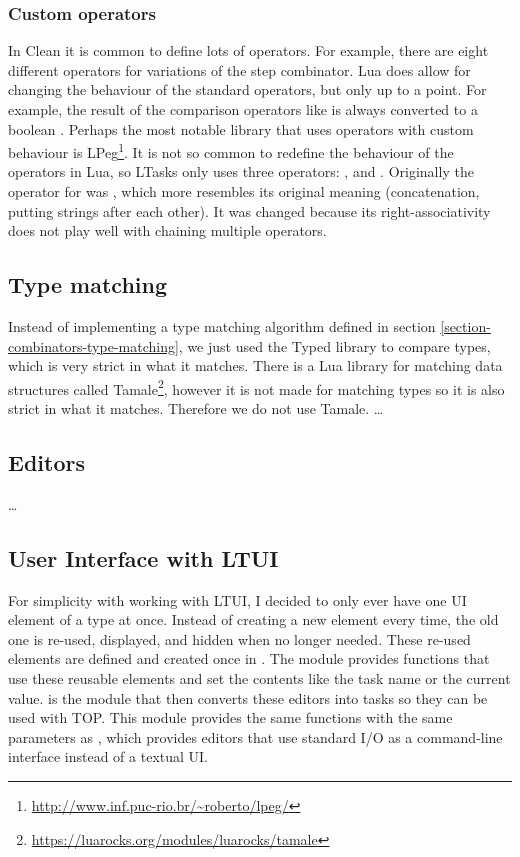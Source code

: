 \subsubsection{Custom operators}
In Clean it is common to define lots of operators. For example, there are eight different operators for variations of the step combinator. Lua does allow for changing the behaviour of the standard operators, but only up to a point. For example, the result of the comparison operators like \lua{<} is always converted to a boolean \cite{luareferencemanual}. Perhaps the most notable library that uses operators with custom behaviour is LPeg\footnote{\url{http://www.inf.puc-rio.br/~roberto/lpeg/}}. It is not so common to redefine the behaviour of the operators in Lua, so LTasks only uses three operators: \lua{~}, \lua{&} and \lua{|}. Originally the operator for  was , which more resembles its original meaning (concatenation, putting strings after each other). It was changed because its right-associativity does not play well with chaining multiple operators.

\subsection{Type matching}
Instead of implementing a type matching algorithm defined in section \ref{section-combinators-type-matching}, we just used the Typed library to compare types, which is very strict in what it matches. There is a Lua library for matching data structures called Tamale\footnote{\url{https://luarocks.org/modules/luarocks/tamale}}, however it is not made for matching types so it is also strict in what it matches. Therefore we do not use Tamale. \dots

\subsection{Editors}
\dots

\subsection{User Interface with LTUI}
For simplicity with working with LTUI, I decided to only ever have one UI element of a type at once. Instead of creating a new element every time, the old one is re-used, displayed, and hidden when no longer needed. These re-used elements are defined and created once in .
The module  provides functions that use these reusable elements and set the contents like the task name or the current value.
 is the module that then converts these editors into tasks so they can be used with TOP. This module provides the same functions with the same parameters as , which provides editors that use standard I/O as a command-line interface instead of a textual UI.

